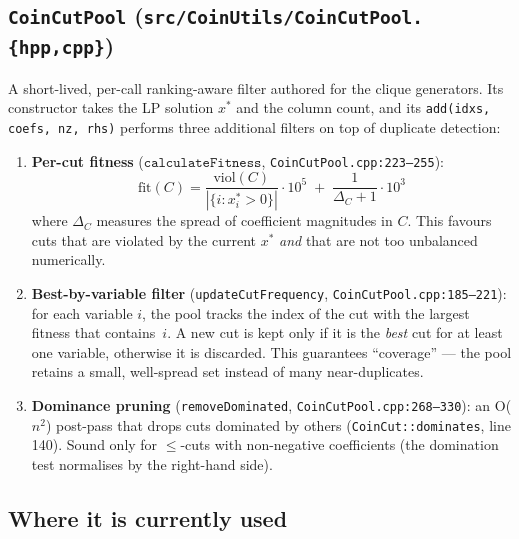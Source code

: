 \documentclass[11pt,a4paper]{article}
\begin{document}
\subsection*{\texttt{CoinCutPool} (\texttt{src/CoinUtils/CoinCutPool.\{hpp,cpp\}})}

A short-lived, per-call ranking-aware filter authored for the
clique generators.  Its
constructor takes the LP solution $x^\ast$ and the column count, and
its \texttt{add(idxs, coefs, nz, rhs)} performs three additional
filters on top of duplicate detection:

\begin{enumerate}[leftmargin=*]
  \item \textbf{Per-cut fitness}
        ($\texttt{calculateFitness}$, \texttt{CoinCutPool.cpp:223--255}):
        \[ \text{fit}(C) = \frac{\text{viol}(C)}{|\{i:x^\ast_i>0\}|}\cdot 10^5 \;+\; \frac{1}{\Delta_C+1}\cdot 10^3 \]
        where $\Delta_C$ measures the spread of coefficient
        magnitudes in $C$.  This favours cuts that are violated by
        the current $x^\ast$ \emph{and} that are not too unbalanced
        numerically.
  \item \textbf{Best-by-variable filter}
        (\texttt{updateCutFrequency}, \texttt{CoinCutPool.cpp:185--221}):
        for each variable $i$, the pool tracks the index of the cut
        with the largest fitness that contains~$i$.  A new cut is
        kept only if it is the \emph{best} cut for at least one
        variable, otherwise it is discarded.  This guarantees
        ``coverage'' --- the pool retains a small, well-spread set
        instead of many near-duplicates.
  \item \textbf{Dominance pruning}
        (\texttt{removeDominated}, \texttt{CoinCutPool.cpp:268--330}):
        an O($n^2$) post-pass that drops cuts dominated by others
        (\texttt{CoinCut::dominates}, line 140).  Sound only for
        $\le$-cuts with non-negative coefficients (the domination
        test normalises by the right-hand side).
\end{enumerate}

\subsection*{Where it is currently used}
\end{document}
